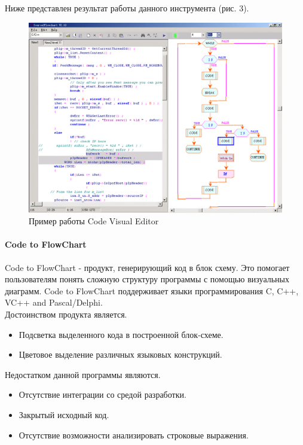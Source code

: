 \documentclass{matmex-diploma}
\begin{document}
Ниже представлен результат работы данного инструмента (рис. 3).
\begin{figure}[h]
\label{CodeVisual}
\centering
\includegraphics{CodeVisualEditor.png}
\caption{Пример работы Code Visual Editor}
\end{figure}


\paragraph {Code to FlowChart}
Code to FlowChart - продукт, генерирующий код в блок схему. Это помогает пользователям понять сложную структуру программы с помощью визуальных диаграмм. Code to FlowChart поддерживает языки программирования C, C++, VC++ and Pascal/Delphi.   \\
Достоинством продукта является.

\begin{itemize}

        \item { Подсветка выделенного кода в построенной блок-схеме. }
        \item { Цветовое выделение различных языковых конструкций. }
        
 \end{itemize}
Недостатком данной программы являются.
\newpage{}
\begin{itemize}

        \item { Отсутствие интеграции со средой разработки. }
        \item { Закрытый исходный код. }
        \item { Отсутствие возможности анализировать строковые выражения. }
        
 \end{itemize}
\end{document}
